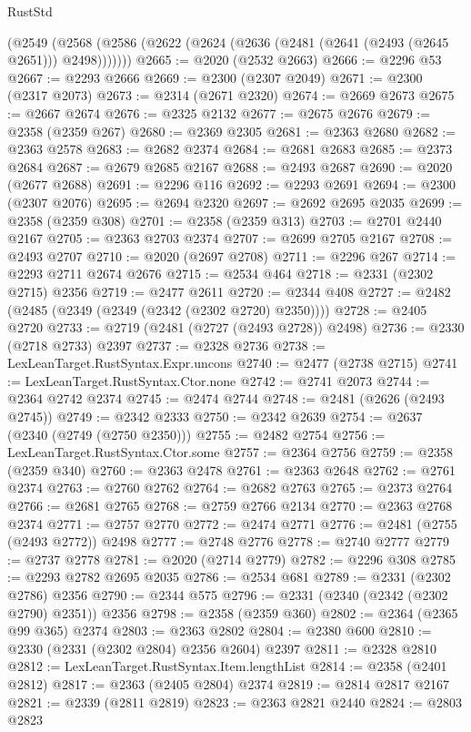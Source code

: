 \begin{lexlean}{RustStd}
\begin{coremodule}
    (@2549 (@2568 (@2586 (@2622 (@2624 (@2636 (@2481 (@2641 (@2493 (@2645 @2651))) @2498)))))))
@2665 := @2020 (@2532 @2663)
@2666 := @2296 @53
@2667 := @2293 @2666
@2669 := @2300 (@2307 @2049)
@2671 := @2300 (@2317 @2073)
@2673 := @2314 (@2671 @2320)
@2674 := @2669 @2673
@2675 := @2667 @2674
@2676 := @2325 @2132
@2677 := @2675 @2676
@2679 := @2358 (@2359 @267)
@2680 := @2369 @2305
@2681 := @2363 @2680
@2682 := @2363 @2578
@2683 := @2682 @2374
@2684 := @2681 @2683
@2685 := @2373 @2684
@2687 := @2679 @2685 @2167
@2688 := @2493 @2687
@2690 := @2020 (@2677 @2688)
@2691 := @2296 @116
@2692 := @2293 @2691
@2694 := @2300 (@2307 @2076)
@2695 := @2694 @2320
@2697 := @2692 @2695 @2035
@2699 := @2358 (@2359 @308)
@2701 := @2358 (@2359 @313)
@2703 := @2701 @2440 @2167
@2705 := @2363 @2703 @2374
@2707 := @2699 @2705 @2167
@2708 := @2493 @2707
@2710 := @2020 (@2697 @2708)
@2711 := @2296 @267
@2714 := @2293 @2711 @2674 @2676
@2715 := @2534 @464
@2718 := @2331 (@2302 @2715) @2356
@2719 := @2477 @2611
@2720 := @2344 @408
@2727 := @2482 (@2485 (@2349 (@2349 (@2342 (@2302 @2720) @2350))))
@2728 := @2405 @2720
@2733 := @2719 (@2481 (@2727 (@2493 @2728)) @2498)
@2736 := @2330 (@2718 @2733) @2397
@2737 := @2328 @2736
@2738 := LexLeanTarget.RustSyntax.Expr.uncons
@2740 := @2477 (@2738 @2715)
@2741 := LexLeanTarget.RustSyntax.Ctor.none
@2742 := @2741 @2073
@2744 := @2364 @2742 @2374
@2745 := @2474 @2744
@2748 := @2481 (@2626 (@2493 @2745))
@2749 := @2342 @2333
@2750 := @2342 @2639
@2754 := @2637 (@2340 (@2749 (@2750 @2350)))
@2755 := @2482 @2754
@2756 := LexLeanTarget.RustSyntax.Ctor.some
@2757 := @2364 @2756
@2759 := @2358 (@2359 @340)
@2760 := @2363 @2478
@2761 := @2363 @2648
@2762 := @2761 @2374
@2763 := @2760 @2762
@2764 := @2682 @2763
@2765 := @2373 @2764
@2766 := @2681 @2765
@2768 := @2759 @2766 @2134
@2770 := @2363 @2768 @2374
@2771 := @2757 @2770
@2772 := @2474 @2771
@2776 := @2481 (@2755 (@2493 @2772)) @2498
@2777 := @2748 @2776
@2778 := @2740 @2777
@2779 := @2737 @2778
@2781 := @2020 (@2714 @2779)
@2782 := @2296 @308
@2785 := @2293 @2782 @2695 @2035
@2786 := @2534 @681
@2789 := @2331 (@2302 @2786) @2356
@2790 := @2344 @575
@2796 := @2331 (@2340 (@2342 (@2302 @2790) @2351)) @2356
@2798 := @2358 (@2359 @360)
@2802 := @2364 (@2365 @99 @365) @2374
@2803 := @2363 @2802
@2804 := @2380 @600
@2810 := @2330 (@2331 (@2302 @2804) @2356 @2604) @2397
@2811 := @2328 @2810
@2812 := LexLeanTarget.RustSyntax.Item.lengthList
@2814 := @2358 (@2401 @2812)
@2817 := @2363 (@2405 @2804) @2374
@2819 := @2814 @2817 @2167
@2821 := @2339 (@2811 @2819)
@2823 := @2363 @2821 @2440
@2824 := @2803 @2823

\end{coremodule}
\end{lexlean}

